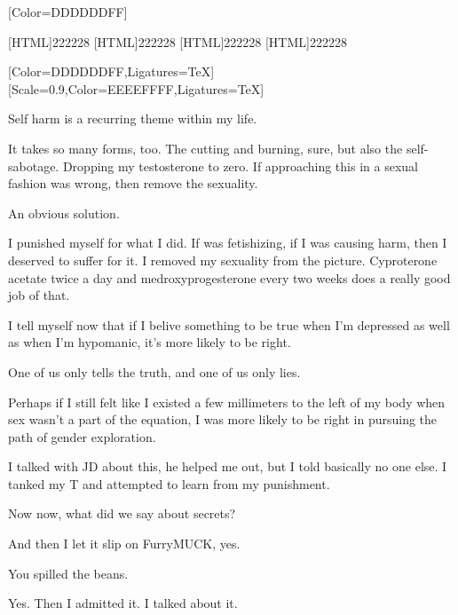 \label{selfharm:selfharm}
\renewfontfamily{}[Color=DDDDDDFF]

[HTML]{222228}
[HTML]{222228}
[HTML]{222228}
[HTML]{222228}

\begin{paracol}{2}
\begin{leftcolumn}

[Color=DDDDDDFF,Ligatures=TeX]
\renewfontfamily{}[Scale=0.9,Color=EEEEFFFF,Ligatures=TeX]

\noindent Self harm is a recurring theme within my life.

It takes so many forms, too. The cutting and burning, sure, but also the self-sabotage. Dropping my testosterone to zero. If approaching this in a sexual fashion was wrong, then remove the sexuality.

\begin{ally}
An obvious solution.
\end{ally}
I punished myself for what I did. If was fetishizing, if I was causing harm, then I deserved to suffer for it. I removed my sexuality from the picture. Cyproterone acetate twice a day and medroxyprogesterone every two weeks does a really good job of that.

I tell myself now that if I belive something to be true when I'm depressed as well as when I'm hypomanic, it's more likely to be right.

\begin{ally}
One of us only tells the truth, and one of us only lies.
\end{ally}
Perhaps if I still felt like I existed a few millimeters to the left of my body when sex wasn't a part of the equation, I was more likely to be right in pursuing the path of gender exploration.

I talked with JD about this, he helped me out, but I told basically no one else. I tanked my T and attempted to learn from my punishment.

\begin{ally}
Now now, what did we say about secrets?
\end{ally}
And then I let it slip on FurryMUCK, yes.

\begin{ally}
You spilled the beans.
\end{ally}
Yes. Then I admitted it. I talked about it.


\end{leftcolumn}
\end{paracol}
